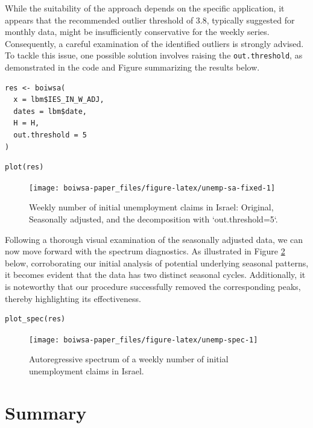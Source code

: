 While the suitability of the approach depends on the specific application, it appears that the recommended outlier threshold of 3.8, typically suggested for monthly data, might be insufficiently conservative for the weekly series. Consequently, a careful examination of the identified outliers is strongly advised. To tackle this issue, one possible solution involves raising the \texttt{out.threshold}, as demonstrated in the code and Figure summarizing the results below.

\begin{verbatim}
res <- boiwsa(
  x = lbm$IES_IN_W_ADJ,
  dates = lbm$date,
  H = H,
  out.threshold = 5
)
\end{verbatim}

\begin{verbatim}
plot(res)
\end{verbatim}

\begin{figure}[H]

{\centering \texttt{[image: boiwsa-paper\_files/figure-latex/unemp-sa-fixed-1]} 

}

\caption{Weekly number of initial unemployment claims in Israel: Original, Seasonally adjusted, and the decomposition with `out.threshold=5`.}\label{fig:unemp-sa-fixed}
\end{figure}

Following a thorough visual examination of the seasonally adjusted data, we can now move forward with the spectrum diagnostics. As illustrated in Figure \ref{fig:unemp-spec} below, corroborating our initial analysis of potential underlying seasonal patterns, it becomes evident that the data has two distinct seasonal cycles. Additionally, it is noteworthy that our procedure successfully removed the corresponding peaks, thereby highlighting its effectiveness.

\begin{verbatim}
plot_spec(res)
\end{verbatim}

\begin{figure}[H]

{\centering \texttt{[image: boiwsa-paper\_files/figure-latex/unemp-spec-1]} 

}

\caption{Autoregressive spectrum of a weekly number of initial unemployment claims in Israel.}\label{fig:unemp-spec}
\end{figure}

\hypertarget{summary}{%
\section{Summary}\label{summary}}


